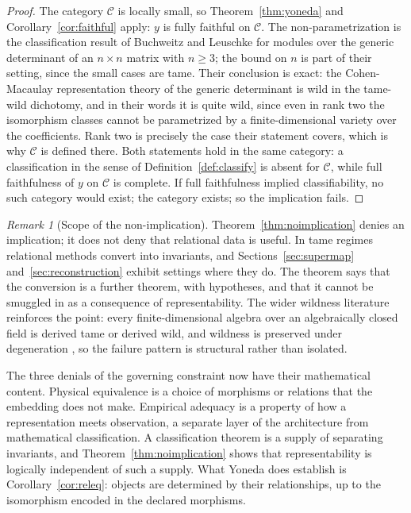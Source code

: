 \documentclass[11pt,letterpaper]{article}
\theoremstyle{definition}
\theoremstyle{remark}
\newtheorem{remark}[theorem]{Remark}
\begin{document}
\begin{proof}
The category $\mathcal{C}$ is locally small, so Theorem~\ref{thm:yoneda} and Corollary~\ref{cor:faithful} apply: $y$ is fully faithful on $\mathcal{C}$. The non-parametrization is the classification result of Buchweitz and Leuschke \cite{buchweitz} for modules over the generic determinant of an $n \times n$ matrix with $n \geq 3$; the bound on $n$ is part of their setting, since the small cases are tame. Their conclusion is exact: the Cohen-Macaulay representation theory of the generic determinant is wild in the tame-wild dichotomy, and in their words it is quite wild, since even in rank two the isomorphism classes cannot be parametrized by a finite-dimensional variety over the coefficients. Rank two is precisely the case their statement covers, which is why $\mathcal{C}$ is defined there. Both statements hold in the same category: a classification in the sense of Definition~\ref{def:classify} is absent for $\mathcal{C}$, while full faithfulness of $y$ on $\mathcal{C}$ is complete. If full faithfulness implied classifiability, no such category would exist; the category exists; so the implication fails.
\end{proof}

\begin{remark}[Scope of the non-implication]
\label{rem:scope}
Theorem~\ref{thm:noimplication} denies an implication; it does not deny that relational data is useful. In tame regimes relational methods convert into invariants, and Sections~\ref{sec:supermap} and~\ref{sec:reconstruction} exhibit settings where they do. The theorem says that the conversion is a further theorem, with hypotheses, and that it cannot be smuggled in as a consequence of representability. The wider wildness literature reinforces the point: every finite-dimensional algebra over an algebraically closed field is derived tame or derived wild, and wildness is preserved under degeneration \cite{bekkert}, so the failure pattern is structural rather than isolated.
\end{remark}

The three denials of the governing constraint now have their mathematical content. Physical equivalence is a choice of morphisms or relations that the embedding does not make. Empirical adequacy is a property of how a representation meets observation, a separate layer of the architecture from mathematical classification. A classification theorem is a supply of separating invariants, and Theorem~\ref{thm:noimplication} shows that representability is logically independent of such a supply. What Yoneda does establish is Corollary~\ref{cor:releq}: objects are determined by their relationships, up to the isomorphism encoded in the declared morphisms.
\end{document}
